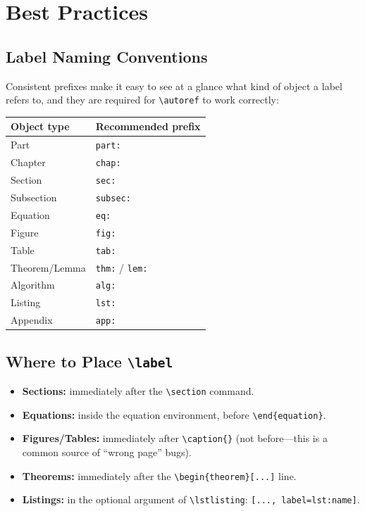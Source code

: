 \documentclass[12pt,a4paper]{article}
\newtheorem{theorem}{Theorem}[section]
\begin{document}
\section{Best Practices}
\label{sec:best_practices}

\subsection{Label Naming Conventions}

Consistent prefixes make it easy to see at a glance what kind of object a
label refers to, and they are required for \verb|\autoref| to work correctly:

\begin{center}
\begin{tabular}{ll}
\toprule
\textbf{Object type}  & \textbf{Recommended prefix} \\
\midrule
Part          & \texttt{part:} \\
Chapter       & \texttt{chap:} \\
Section       & \texttt{sec:} \\
Subsection    & \texttt{subsec:} \\
Equation      & \texttt{eq:} \\
Figure        & \texttt{fig:} \\
Table         & \texttt{tab:} \\
Theorem/Lemma & \texttt{thm:} / \texttt{lem:} \\
Algorithm     & \texttt{alg:} \\
Listing       & \texttt{lst:} \\
Appendix      & \texttt{app:} \\
\bottomrule
\end{tabular}
\end{center}

\subsection{Where to Place \texttt{\textbackslash label}}

\begin{itemize}
    \item \textbf{Sections:} immediately after the \verb|\section| command.
    \item \textbf{Equations:} inside the equation environment, before
          \verb|\end{equation}|.
    \item \textbf{Figures/Tables:} immediately after \verb|\caption{}|
          (not before—this is a common source of ``wrong page'' bugs).
    \item \textbf{Theorems:} immediately after the
          \verb|\begin{theorem}[...]| line.
    \item \textbf{Listings:} in the optional argument of \verb|\lstlisting|:
          \verb|[..., label=lst:name]|.
\end{itemize}
\end{document}
